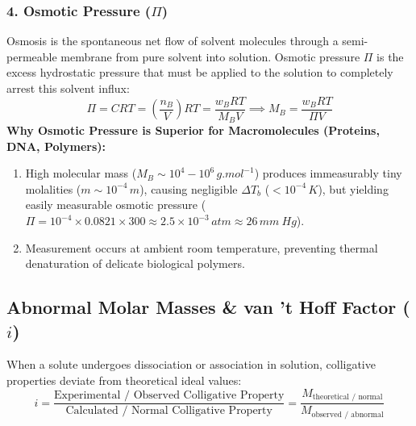 \documentclass[10pt,twoside,openright]{book}
\begin{document}
\subsubsection{4. Osmotic Pressure ($\Pi$)}
Osmosis is the spontaneous net flow of solvent molecules through a semi-permeable membrane from pure solvent into solution. Osmotic pressure $\Pi$ is the excess hydrostatic pressure that must be applied to the solution to completely arrest this solvent influx:
\begin{equation}
  \Pi = C R T = \left(\frac{n_B}{V}\right) R T = \frac{w_B R T}{M_B V} \implies M_B = \frac{w_B R T}{\Pi V}
\end{equation}
\textbf{Why Osmotic Pressure is Superior for Macromolecules (Proteins, DNA, Polymers):}
\begin{enumerate}
  \item High molecular mass ($M_B \sim 10^4 - 10^6\,\si{g.mol^{-1}}$) produces immeasurably tiny molalities ($m \sim 10^{-4}\,\si{m}$), causing negligible $\Delta T_b$ ($< 10^{-4}\,\si{K}$), but yielding easily measurable osmotic pressure ($\Pi = 10^{-4} \times 0.0821 \times 300 \approx 2.5 \times 10^{-3}\,\si{atm} \approx 26\,\si{mm\ Hg}$).
  \item Measurement occurs at ambient room temperature, preventing thermal denaturation of delicate biological polymers.
\end{enumerate}

\subsection{Abnormal Molar Masses \& van 't Hoff Factor ($i$)}
When a solute undergoes dissociation or association in solution, colligative properties deviate from theoretical ideal values:
\begin{equation}
  i = \frac{\text{Experimental / Observed Colligative Property}}{\text{Calculated / Normal Colligative Property}} = \frac{M_{\text{theoretical / normal}}}{M_{\text{observed / abnormal}}}
\end{equation}
\end{document}
